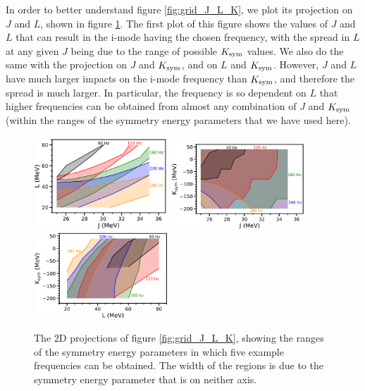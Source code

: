 \documentclass[fleqn,usenatbib]{mnras}
\begin{document}
In order to better understand figure \ref{fig:grid_J_L_K}, we plot its projection on $J$ and $L$, shown in figure \ref{fig:freq_contours_plane}. The first plot of this figure shows the values of $J$ and $L$ that can result in the i-mode having the chosen frequency, with the spread in $L$ at any given $J$ being due to the range of possible $K_{\rm sym}$ values. We also do the same with the projection on $J$ and $K_{\rm sym}$, and on $L$ and $K_{\rm sym}$. However, $J$ and $L$ have much larger impacts on the i-mode frequency than $K_{\rm sym}$, and therefore the spread is much larger. In particular, the frequency is so dependent on $L$ that higher frequencies can be obtained from almost any combination of $J$ and $K_{\rm sym}$ (within the ranges of the symmetry energy parameters that we have used here).


\begin{figure}
\centering
\includegraphics[width=0.45\textwidth,angle=0]{grid_JL_Kspread.png}
\includegraphics[width=0.45\textwidth,angle=0]{grid_JK_Lspread.png}
\includegraphics[width=0.45\textwidth,angle=0]{grid_LK_Jspread.png}
\caption{The 2D projections of figure \ref{fig:grid_J_L_K}, showing the ranges of the symmetry energy parameters in which five example frequencies can be obtained. The width of the regions is due to the symmetry energy parameter that is on neither axis.}%
\label{fig:freq_contours_plane}
\end{figure}
\end{document}
